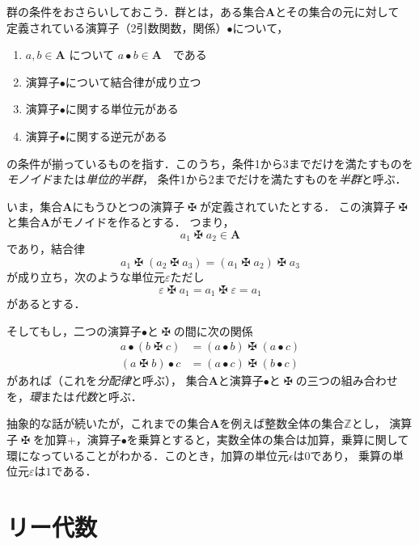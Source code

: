 \documentclass{jsbook}
\newcommand{\keyword}[1]{\emph{#1}}
\newcommand{\bop}[1]{\boldsymbol{#1}}
\newcommand{\bg}[1]{\mathbf{#1}}
\newcommand{\opmaltese}{\mathop{\maltese}}
\begin{document}
群の条件をおさらいしておこう．群とは，ある集合$\bg{A}$とその集合の元に対して
定義されている演算子（2引数関数，関係）$\bullet$について，
\begin{enumerate}
\item $a,b\in\bg{A}$ について $a\bullet b\in\bop{A}$　である
\item 演算子$\bullet$について結合律が成り立つ
\item 演算子$\bullet$に関する単位元がある
\item 演算子$\bullet$に関する逆元がある
\end{enumerate}
の条件が揃っているものを指す．このうち，条件1から3までだけを満たすものを\keyword{モノイド}または\keyword{単位的半群}，
条件1から2までだけを満たすものを\keyword{半群}と呼ぶ．

いま，集合$\bg{A}$にもうひとつの演算子$\opmaltese$が定義されていたとする．
この演算子$\opmaltese$と集合$\bg{A}$がモノイドを作るとする．
つまり，
\begin{equation}
a_1\opmaltese a_2\in\bg{A}
\end{equation}
であり，結合律
\begin{equation}
a_1\opmaltese(a_2\opmaltese a_3)=(a_1\opmaltese a_2)\opmaltese a_3
\end{equation}
が成り立ち，次のような単位元$\varepsilon$ただし
\begin{equation}
\varepsilon\opmaltese a_1=a_1\opmaltese\varepsilon=a_1
\end{equation}
があるとする．

そしてもし，二つの演算子$\bullet$と$\opmaltese$の間に次の関係
\begin{align}
a\bullet(b\opmaltese c)&=(a\bullet b)\opmaltese(a\bullet c)\\
(a\opmaltese b)\bullet c&=(a\bullet c)\opmaltese(b\bullet c)
\end{align}
があれば（これを\keyword{分配律}と呼ぶ），
集合$\bg{A}$と演算子$\bullet$と$\opmaltese$の三つの組み合わせを，\keyword{環}または\keyword{代数}と呼ぶ．

抽象的な話が続いたが，これまでの集合$\bg{A}$を例えば整数全体の集合$\mathbb{Z}$とし，
演算子$\opmaltese$を加算$+$，演算子$\bullet$を乗算とすると，実数全体の集合は加算，乗算に関して
環になっていることがわかる．このとき，加算の単位元$\epsilon$は$0$であり，
乗算の単位元$\varepsilon$は$1$である．


\chapter{リー代数}
\end{document}
